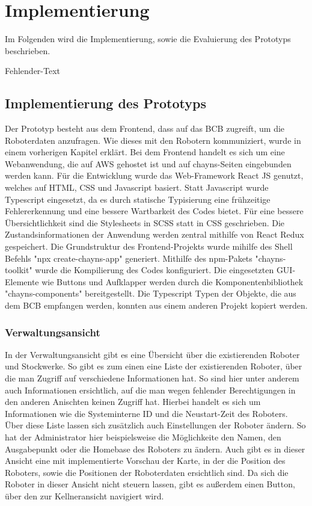 \newpage
\section{Implementierung}
Im Folgenden wird die Implementierung, sowie die Evaluierung des Prototyps beschrieben.

Fehlender-Text

\subsection{Implementierung des Prototyps}
Der Prototyp besteht aus dem Frontend, dass auf das \ac{BCB} zugreift, um die Roboterdaten anzufragen. Wie dieses mit den Robotern kommuniziert, wurde in einem vorherigen Kapitel erklärt. Bei dem Frontend handelt es sich um eine Webanwendung, die auf AWS gehostet ist und auf chayns-Seiten eingebunden werden kann. Für die Entwicklung wurde das Web-Framework React JS genutzt, welches auf HTML, CSS und Javascript basiert. Statt Javascript wurde Typescript eingesetzt, da es durch statische Typisierung eine frühzeitige Fehlererkennung und eine bessere Wartbarkeit des Codes bietet. Für eine bessere Übersichtlichkeit sind die Stylesheets in SCSS statt in CSS geschrieben. Die Zustandsinformationen der Anwendung werden zentral mithilfe von React Redux gespeichert. Die Grundstruktur des Frontend-Projekts wurde mihilfe des Shell Befehls "npx create-chayns-app" generiert. Mithilfe des npm-Pakets "chayns-toolkit" wurde die Kompilierung des Codes konfiguriert. Die eingesetzten GUI-Elemente wie Buttons und Aufklapper werden durch die Komponentenbibliothek "chayns-components" bereitgestellt. Die Typescript Typen der Objekte, die aus dem \ac{BCB} empfangen werden, konnten aus einem anderen Projekt kopiert werden.

\subsubsection{Verwaltungsansicht}
In der Verwaltungsansicht gibt es eine Übersicht über die existierenden Roboter und Stockwerke. So gibt es zum einen eine Liste der existierenden Roboter, über die man Zugriff auf verschiedene Informationen hat. So sind hier unter anderem auch Informationen ersichtlich, auf die man wegen fehlender Berechtigungen in den anderen Anischten keinen Zugriff hat. Hierbei handelt es sich um Informationen wie die Systeminterne \ac{ID} und die Neustart-Zeit des Roboters. Über diese Liste lassen sich zusätzlich auch Einstellungen der Roboter ändern. So hat der Administrator hier beispielsweise die Möglichkeite den Namen, den Ausgabepunkt oder die Homebase des Roboters zu ändern. Auch gibt es in dieser Ansicht eine mit \deckgl implementierte Vorschau der Karte, in der die Position des Roboters, sowie die Positionen der Roboterdaten ersichtlich sind. Da sich die Roboter in dieser Ansicht nicht steuern lassen, gibt es außerdem einen Button, über den zur Kellneransicht navigiert wird.

